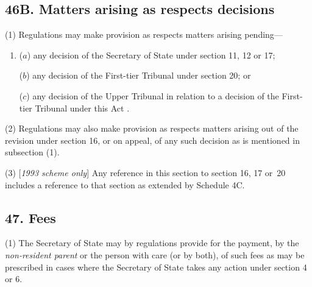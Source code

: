 \documentclass[12pt,a4paper]{article}
\begin{document}
\subsection{46B. Matters arising as respects decisions}

(1) Regulations may make provision as respects matters arising pending—
\begin{enumerate}\item[]
($a$) any decision of the 
Secretary of State  %
under section 11, 12 or 17;

($b$) any decision of 
the First-tier Tribunal  %
under section 20; or

($c$) any decision of 
the Upper Tribunal in relation to a decision of the First-tier Tribunal under this Act%
.
\end{enumerate}

(2) Regulations may also make provision as respects matters arising out of the revision under section 16, or on appeal, of any such decision as is mentioned in subsection (1).

(3) [\emph{1993 scheme only}] Any reference in this section to section 16, 17 or~20 includes a reference to that section as extended by Schedule 4C.


\subsection{47. Fees}

(1) The Secretary of State may by regulations provide for the payment, by the 
\emph{non-resident parent}  %
or the person with care (or by both), of such fees as may be prescribed in cases where the Secretary of State takes any action under section 4 or 6.
\end{document}
